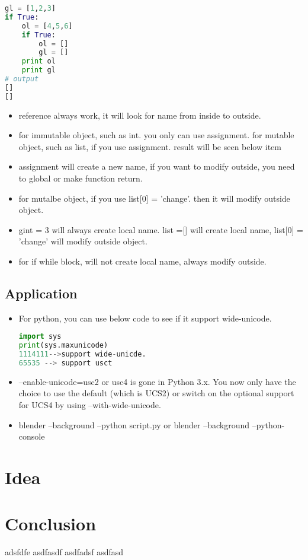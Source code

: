 \documentclass[a4paper,12pt,twoside]{book}
\begin{document}
\begin{lstlisting}[frame=single, language=python]
gl = [1,2,3]
if True:
	ol = [4,5,6]
	if True:
		ol = []
		gl = []
	print ol
	print gl
# output 
[]
[]
\end{lstlisting}  





\begin{itemize}
		\item reference always work, it will look for name from inside to outside.
		\item for immutable object, such as int. you only can use assignment. for mutable object, such as list, if you use assignment. result will be seen below item
		\item assignment will create a new name, if you want to modify outside, you need to global or make function return.
		\item for mutalbe object, if you use list[0] = 'change'. then it will modify outside object.
		\item gint = 3 will always create local name. list =[] will create local name, list[0] = 'change' will modify outside object.
		\item for if while block, will not create local name, always modify outside. 
\end{itemize}

\section{Application}
\begin{itemize}
		\item For python, you can use below code to see if it support wide-unicode.
\begin{lstlisting}[frame=single, language=python]
import sys
print(sys.maxunicode) 
1114111-->support wide-unicde.
65535 --> support usct
\end{lstlisting} 
		\item --enable-unicode=usc2 or usc4 is gone in Python 3.x. You now only have the choice to use the default (which is UCS2) or switch on the optional support for UCS4 by using --with-wide-unicode.

		\item blender --background --python script.py or blender --background --python-console

\end{itemize}

\chapter{Idea}



\chapter{Conclusion}

adsfdfe
asdfasdf
asdfadsf
asdfasd


%
\end{document}
